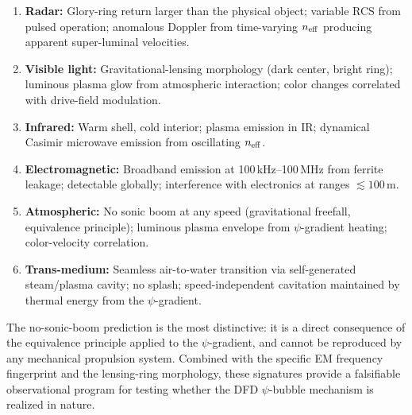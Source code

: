 \documentclass[11pt]{article}
\newcommand{\neff}{n_{\rm eff}}
\begin{document}
\begin{enumerate}
\item \textbf{Radar:} Glory-ring return larger than the physical object;
  variable RCS from pulsed operation; anomalous Doppler from time-varying
  $\neff$ producing apparent super-luminal velocities.

\item \textbf{Visible light:} Gravitational-lensing morphology (dark center,
  bright ring); luminous plasma glow from atmospheric interaction; color
  changes correlated with drive-field modulation.

\item \textbf{Infrared:} Warm shell, cold interior; plasma emission in IR;
  dynamical Casimir microwave emission from oscillating $\neff$.

\item \textbf{Electromagnetic:} Broadband emission at 100\,kHz--100\,MHz
  from ferrite leakage; detectable globally; interference with electronics
  at ranges $\lesssim 100$\,m.

\item \textbf{Atmospheric:} No sonic boom at any speed (gravitational
  freefall, equivalence principle); luminous plasma envelope from
  $\psi$-gradient heating; color-velocity correlation.

\item \textbf{Trans-medium:} Seamless air-to-water transition via
  self-generated steam/plasma cavity; no splash; speed-independent
  cavitation maintained by thermal energy from the $\psi$-gradient.
\end{enumerate}

The no-sonic-boom prediction is the most distinctive: it is a direct
consequence of the equivalence principle applied to the $\psi$-gradient,
and cannot be reproduced by any mechanical propulsion system. Combined
with the specific EM frequency fingerprint and the lensing-ring morphology,
these signatures provide a falsifiable observational program for testing
whether the DFD $\psi$-bubble mechanism is realized in nature.
\end{document}
